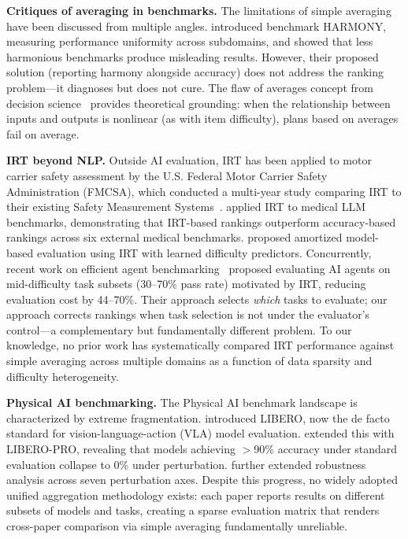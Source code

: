 \documentclass[11pt,a4paper]{article}
\begin{document}
\textbf{Critiques of averaging in benchmarks.} The limitations of simple averaging have been discussed from multiple angles. \citet{uzunoglu2025} introduced benchmark HARMONY, measuring performance uniformity across subdomains, and showed that less harmonious benchmarks produce misleading results. However, their proposed solution (reporting harmony alongside accuracy) does not address the ranking problem---it diagnoses but does not cure. The flaw of averages concept from decision science~\cite{savage2009} provides theoretical grounding: when the relationship between inputs and outputs is nonlinear (as with item difficulty), plans based on averages fail on average.

\textbf{IRT beyond NLP.} Outside AI evaluation, IRT has been applied to motor carrier safety assessment by the U.S. Federal Motor Carrier Safety Administration (FMCSA), which conducted a multi-year study comparing IRT to their existing Safety Measurement Systems~\cite{fmcsa2021}. \citet{singhal2025} applied IRT to medical LLM benchmarks, demonstrating that IRT-based rankings outperform accuracy-based rankings across six external medical benchmarks. \citet{truong2025} proposed amortized model-based evaluation using IRT with learned difficulty predictors. Concurrently, recent work on efficient agent benchmarking~\cite{agentbench2026} proposed evaluating AI agents on mid-difficulty task subsets (30--70\% pass rate) motivated by IRT, reducing evaluation cost by 44--70\%. Their approach selects \emph{which} tasks to evaluate; our approach corrects rankings when task selection is not under the evaluator's control---a complementary but fundamentally different problem. To our knowledge, no prior work has systematically compared IRT performance against simple averaging across multiple domains as a function of data sparsity and difficulty heterogeneity.

\textbf{Physical AI benchmarking.} The Physical AI benchmark landscape is characterized by extreme fragmentation. \citet{liu2023libero} introduced LIBERO, now the de facto standard for vision-language-action (VLA) model evaluation. \citet{zhou2025b} extended this with LIBERO-PRO, revealing that models achieving $>$90\% accuracy under standard evaluation collapse to 0\% under perturbation. \citet{fei2025} further extended robustness analysis across seven perturbation axes. Despite this progress, no widely adopted unified aggregation methodology exists: each paper reports results on different subsets of models and tasks, creating a sparse evaluation matrix that renders cross-paper comparison via simple averaging fundamentally unreliable.
\end{document}

